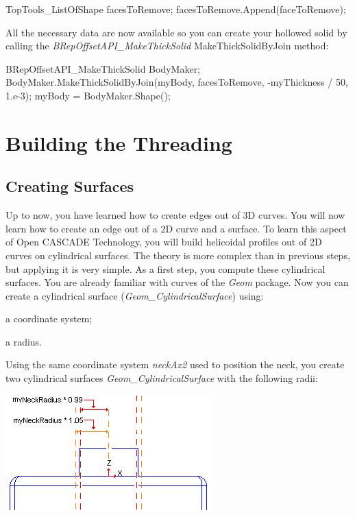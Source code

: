 \begin{DoxyCode}
TopTools\_ListOfShape facesToRemove;
facesToRemove.Append(faceToRemove);
\end{DoxyCode}


All the necessary data are now available so you can create your hollowed solid by calling the {\itshape B\+Rep\+Offset\+A\+P\+I\+\_\+\+Make\+Thick\+Solid} Make\+Thick\+Solid\+By\+Join method\+:


\begin{DoxyCode}
BRepOffsetAPI\_MakeThickSolid BodyMaker;
BodyMaker.MakeThickSolidByJoin(myBody, facesToRemove, -myThickness / 50, 1.e-3);
myBody = BodyMaker.Shape();
\end{DoxyCode}
\hypertarget{occt__tutorial_sec4}{}\section{Building the Threading}\label{occt__tutorial_sec4}
\hypertarget{occt__tutorial_OCCT_TUTORIAL_SUB4_1}{}\subsection{Creating Surfaces}\label{occt__tutorial_OCCT_TUTORIAL_SUB4_1}
Up to now, you have learned how to create edges out of 3D curves. You will now learn how to create an edge out of a 2D curve and a surface. To learn this aspect of Open C\+A\+S\+C\+A\+DE Technology, you will build helicoidal profiles out of 2D curves on cylindrical surfaces. The theory is more complex than in previous steps, but applying it is very simple. As a first step, you compute these cylindrical surfaces. You are already familiar with curves of the {\itshape Geom} package. Now you can create a cylindrical surface ({\itshape Geom\+\_\+\+Cylindrical\+Surface}) using\+:


\begin{DoxyItemize}
\item a coordinate system;
\item a radius.
\end{DoxyItemize}

Using the same coordinate system {\itshape neck\+Ax2} used to position the neck, you create two cylindrical surfaces {\itshape Geom\+\_\+\+Cylindrical\+Surface} with the following radii\+:


\begin{DoxyImageNoCaption}
\begin{center}
   \mbox{\includegraphics[width=300]{tutorial_image011.png}}
\end{center}
\end{DoxyImageNoCaption}


